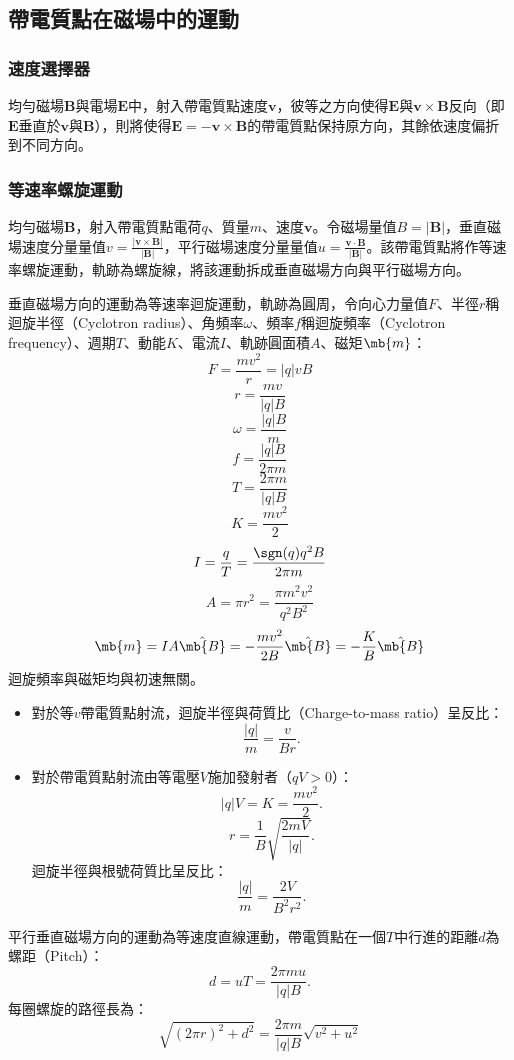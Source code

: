 \documentclass[a4paper,12pt]{report}
\begin{document}
\begin{itemize}
\subsection{帶電質點在磁場中的運動}
\subsubsection{速度選擇器}
均勻磁場$\mathbf{B}$與電場$\mathbf{E}$中，射入帶電質點速度$\mathbf{v}$，彼等之方向使得$\mathbf{E}$與$\mathbf{v}\times\mathbf{B}$反向（即$\mathbf{E}$垂直於$\mathbf{v}$與$\mathbf{B}$），則將使得$\mathbf{E}=-\mathbf{v}\times\mathbf{B}$的帶電質點保持原方向，其餘依速度偏折到不同方向。
\subsubsection{等速率螺旋運動}
均勻磁場$\mathbf{B}$，射入帶電質點電荷$q$、質量$m$、速度$\mathbf{v}$。令磁場量值$B=|\mathbf{B}|$，垂直磁場速度分量量值$v=\frac{|\mathbf{v}\times\mathbf{B}|}{|\mathbf{B}|}$，平行磁場速度分量量值$u=\frac{\mathbf{v}\cdot\mathbf{B}}{|\mathbf{B}|}$。該帶電質點將作等速率螺旋運動，軌跡為螺旋線，將該運動拆成垂直磁場方向與平行磁場方向。

垂直磁場方向的運動為等速率迴旋運動，軌跡為圓周，令向心力量值$F$、半徑$r$稱迴旋半徑（Cyclotron radius）、角頻率$\omega$、頻率$f$稱迴旋頻率（Cyclotron frequency）、週期$T$、動能$K$、電流$I$、軌跡圓面積$A$、磁矩$\mb{m}$：
\[F=\frac{mv^2}{r}=|q|vB\]
\[r=\frac{mv}{|q|B}\]
\[\omega=\frac{|q|B}{m}\]
\[f=\frac{|q|B}{2\pi m}\]
\[T=\frac{2\pi m}{|q|B}\]
\[K=\frac{mv^2}{2}\]
\[I=\frac{q}{T}=\frac{\sgn(q)q^2B}{2\pi m}\]
\[A=\pi r^2=\frac{\pi m^2v^2}{q^2B^2}\]
\[\mb{m}=IA\hat{\mb{B}}=-\frac{mv^2}{2B}\hat{\mb{B}}=-\frac{K}{B}\hat{\mb{B}}\]
迴旋頻率與磁矩均與初速無關。
\begin{itemize}
\item 對於等$v$帶電質點射流，迴旋半徑與荷質比（Charge-to-mass ratio）呈反比：
\[\frac{|q|}{m}=\frac{v}{Br}.\]
\item 對於帶電質點射流由等電壓$V$施加發射者（$qV>0$）：
\[|q|V=K=\frac{mv^2}{2}.\]
\[r=\frac{1}{B}\sqrt{\frac{2mV}{|q|}}.\]
迴旋半徑與根號荷質比呈反比：
\[\frac{|q|}{m}=\frac{2V}{B^2r^2}.\]
\end{itemize}
平行垂直磁場方向的運動為等速度直線運動，帶電質點在一個$T$中行進的距離$d$為螺距（Pitch）：
\[d=uT=\frac{2\pi mu}{|q|B}.\]
每圈螺旋的路徑長為：
\[\sqrt{(2\pi r)^2+d^2}=\frac{2\pi m}{|q|B}\sqrt{v^2+u^2}\]

\end{itemize}
\end{document}
